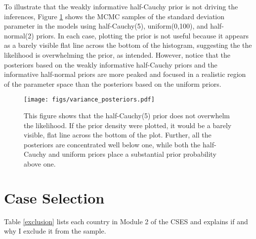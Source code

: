 \documentclass[12pt]{article}
\begin{document}
\begin{appendix}
To illustrate that the weakly informative half-Cauchy prior is not driving the inferences, Figure \ref{postvar} shows the MCMC samples of the standard deviation parameter in the models using half-Cauchy(5), uniform(0,100), and half-normal(2) priors. In each case, plotting the prior is not useful because it appears as a barely visible flat line across the bottom of the histogram, suggesting the the likelihood is overwhelming the prior, as intended. However, notice that the posteriors based on the weakly informative half-Cauchy priors and the informative half-normal priors are more peaked and focused in a realistic region of the parameter space than the posteriors based on the uniform priors.

\begin{figure}[h!]
\centering
\texttt{[image: figs/variance\_posteriors.pdf]}
\caption{This figure shows that the half-Cauchy(5) prior does not overwhelm the likelihood. If the prior density were plotted, it would be a barely visible, flat line across the bottom of the plot. Further, all the posteriors are concentrated well below one, while both the half-Cauchy and uniform priors place a substantial prior probability above one.}\label{postvar}
\end{figure}

\clearpage
\section{Case Selection}

Table \ref{exclusion} lists each country in Module 2 of the CSES and explains if and why I exclude it from the sample.


\end{appendix}
\end{document}
